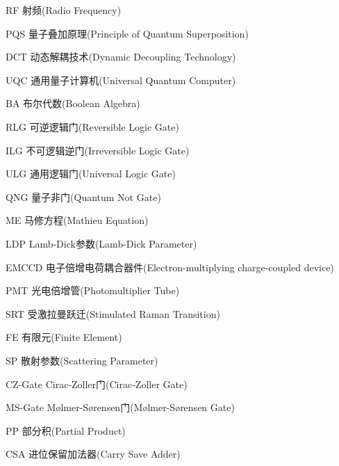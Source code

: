 



\begin{denotation}[3cm]
  \item[RF] 射频(Radio Frequency)
  \item[PQS] 量子叠加原理(Principle of Quantum Superposition)
  \item[DCT] 动态解耦技术(Dynamic Decoupling Technology)
  \item[UQC] 通用量子计算机(Universal Quantum Computer)
  \item[BA] 布尔代数(Boolean Algebra)
  \item[RLG] 可逆逻辑门(Reversible Logic Gate)
  \item[ILG] 不可逻辑逆门(Irreversible Logic Gate)
  \item[ULG] 通用逻辑门(Universal Logic Gate)
  \item[QNG] 量子非门(Quantum Not Gate)
  \item[ME] 马修方程(Mathieu Equation)
  \item[LDP] Lamb-Dick参数(Lamb-Dick Parameter)
  \item[EMCCD] 电子倍增电荷耦合器件(Electron-multiplying charge-coupled device)
  \item[PMT] 光电倍增管(Photomultiplier Tube)
  \item[SRT] 受激拉曼跃迁(Stimulated Raman Transition)
  \item[FE] 有限元(Finite Element)
  \item[SP] 散射参数(Scattering Parameter)
  \item[CZ-Gate] Cirac-Zoller门(Cirac-Zoller Gate)
  \item[MS-Gate] Mølmer-Sørensen门(Mølmer-Sørensen Gate)
  \item[PP] 部分积(Partial Product)
  \item[CSA] 进位保留加法器(Carry Save Adder)
\end{denotation}



